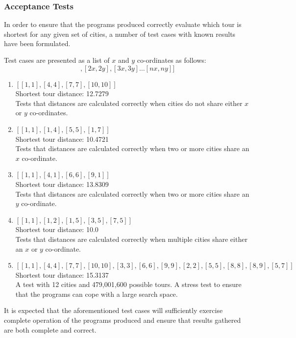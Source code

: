 \documentclass[12pt,a4paper]{article}
\begin{document}
\subsubsection{Acceptance Tests}

In order to ensure that the programs produced correctly evaluate which tour is shortest for any given set of cities, a number of test cases with known results have been formulated.

Test cases are presented as a list of $x$ and $y$ co-ordinates as follows: 
\begin{displaymath}
[[1x,1y],[2x,2y],[3x,3y] \ldots [nx,ny]]
\end{displaymath}
\begin{enumerate}
  \item $[[1,1],[4,4],[7,7],[10,10]]$ \\ Shortest tour distance: 12.7279 \\ Tests that distances are calculated correctly when cities do not share either $x$ or $y$ co-ordinates.
    
  \item $[[1,1],[1,4],[5,5],[1,7]]$ \\ Shortest tour distance: 10.4721 \\ Tests that distances are calculated correctly when two or more cities share an $x$ co-ordinate.

  \item $[[1,1],[4,1],[6,6],[9,1]]$ \\ Shortest tour distance: 13.8309 \\ Tests that distances are calculated correctly when two or more cities share an $y$ co-ordinate.

  \item $[[1,1],[1,2],[1,5],[3,5],[7,5]]$ \\ Shortest tour distance: 10.0\\ Tests that distances are calculated correctly when multiple cities share either an $x$ or $y$ co-ordinate.

  \item $[[1,1],[4,4],[7,7],[10,10],[3,3],[6,6],[9,9],[2,2],[5,5],[8,8],[8,9],[5,7]]$
    \\ Shortest tour distance: 15.3137\\ A test with 12 cities and 479,001,600 possible tours. A stress test to ensure that the programs can cope with a large search space.
\end{enumerate}

It is expected that the aforementioned test cases will sufficiently exercise complete operation of the programs produced and ensure that results gathered are both complete and correct.
\end{document}
